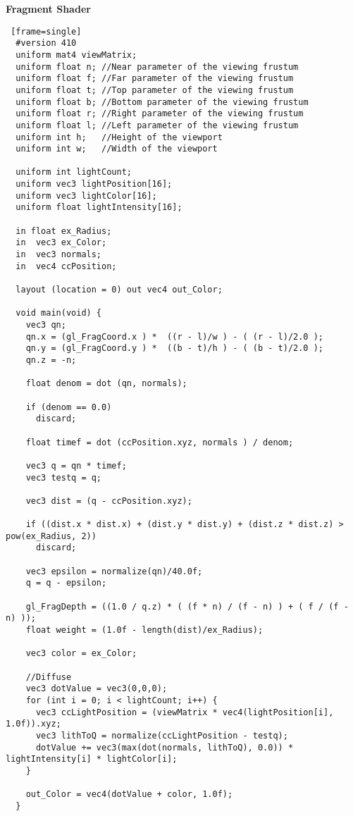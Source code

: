 \textbf{Fragment Shader}
\begin{lstlisting} [frame=single]
  #version 410
  uniform mat4 viewMatrix;
  uniform float n; //Near parameter of the viewing frustum
  uniform float f; //Far parameter of the viewing frustum
  uniform float t; //Top parameter of the viewing frustum
  uniform float b; //Bottom parameter of the viewing frustum
  uniform float r; //Right parameter of the viewing frustum
  uniform float l; //Left parameter of the viewing frustum
  uniform int h;   //Height of the viewport
  uniform int w;   //Width of the viewport

  uniform int lightCount;
  uniform vec3 lightPosition[16];
  uniform vec3 lightColor[16];
  uniform float lightIntensity[16];

  in float ex_Radius;
  in  vec3 ex_Color;
  in  vec3 normals;
  in  vec4 ccPosition;

  layout (location = 0) out vec4 out_Color;

  void main(void) {
    vec3 qn;
    qn.x = (gl_FragCoord.x ) *  ((r - l)/w ) - ( (r - l)/2.0 );
    qn.y = (gl_FragCoord.y ) *  ((b - t)/h ) - ( (b - t)/2.0 );
    qn.z = -n;

    float denom = dot (qn, normals);

    if (denom == 0.0)
      discard;

    float timef = dot (ccPosition.xyz, normals ) / denom;

    vec3 q = qn * timef;
    vec3 testq = q;

    vec3 dist = (q - ccPosition.xyz);

    if ((dist.x * dist.x) + (dist.y * dist.y) + (dist.z * dist.z) > pow(ex_Radius, 2))
      discard;

    vec3 epsilon = normalize(qn)/40.0f;
    q = q - epsilon;

    gl_FragDepth = ((1.0 / q.z) * ( (f * n) / (f - n) ) + ( f / (f - n) ));
    float weight = (1.0f - length(dist)/ex_Radius);

    vec3 color = ex_Color;

    //Diffuse
    vec3 dotValue = vec3(0,0,0);
    for (int i = 0; i < lightCount; i++) {
      vec3 ccLightPosition = (viewMatrix * vec4(lightPosition[i], 1.0f)).xyz;
      vec3 lithToQ = normalize(ccLightPosition - testq);
      dotValue += vec3(max(dot(normals, lithToQ), 0.0)) * lightIntensity[i] * lightColor[i];
    }

    out_Color = vec4(dotValue + color, 1.0f);
  }
\end{lstlisting}
\newpage

